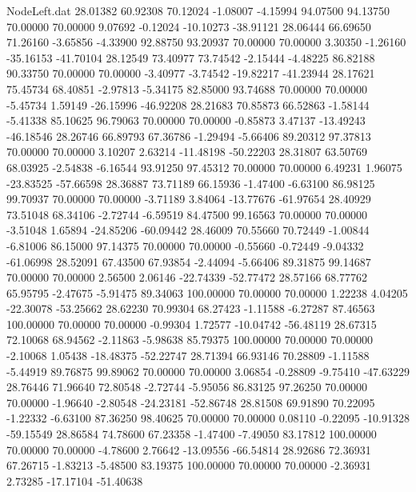 \begin{filecontents}{NodeLeft.dat}
  28.01382   60.92308   70.12024    -1.08007   -4.15994   94.07500   94.13750   70.00000   70.00000    9.07692   -0.12024  -10.10273  -38.91121
  28.06444   66.69650   71.26160    -3.65856   -4.33900   92.88750   93.20937   70.00000   70.00000    3.30350   -1.26160  -35.16153  -41.70104
  28.12549   73.40977   73.74542    -2.15444   -4.48225   86.82188   90.33750   70.00000   70.00000   -3.40977   -3.74542  -19.82217  -41.23944
  28.17621   75.45734   68.40851    -2.97813   -5.34175   82.85000   93.74688   70.00000   70.00000   -5.45734    1.59149  -26.15996  -46.92208
  28.21683   70.85873   66.52863    -1.58144   -5.41338   85.10625   96.79063   70.00000   70.00000   -0.85873    3.47137  -13.49243  -46.18546
  28.26746   66.89793   67.36786    -1.29494   -5.66406   89.20312   97.37813   70.00000   70.00000    3.10207    2.63214  -11.48198  -50.22203
  28.31807   63.50769   68.03925    -2.54838   -6.16544   93.91250   97.45312   70.00000   70.00000    6.49231    1.96075  -23.83525  -57.66598
  28.36887   73.71189   66.15936    -1.47400   -6.63100   86.98125   99.70937   70.00000   70.00000   -3.71189    3.84064  -13.77676  -61.97654
  28.40929   73.51048   68.34106    -2.72744   -6.59519   84.47500   99.16563   70.00000   70.00000   -3.51048    1.65894  -24.85206  -60.09442
  28.46009   70.55660   70.72449    -1.00844   -6.81006   86.15000   97.14375   70.00000   70.00000   -0.55660   -0.72449   -9.04332  -61.06998
  28.52091   67.43500   67.93854    -2.44094   -5.66406   89.31875   99.14687   70.00000   70.00000    2.56500    2.06146  -22.74339  -52.77472
  28.57166   68.77762   65.95795    -2.47675   -5.91475   89.34063  100.00000   70.00000   70.00000    1.22238    4.04205  -22.30078  -53.25662
  28.62230   70.99304   68.27423    -1.11588   -6.27287   87.46563  100.00000   70.00000   70.00000   -0.99304    1.72577  -10.04742  -56.48119
  28.67315   72.10068   68.94562    -2.11863   -5.98638   85.79375  100.00000   70.00000   70.00000   -2.10068    1.05438  -18.48375  -52.22747
  28.71394   66.93146   70.28809    -1.11588   -5.44919   89.76875   99.89062   70.00000   70.00000    3.06854   -0.28809   -9.75410  -47.63229
  28.76446   71.96640   72.80548    -2.72744   -5.95056   86.83125   97.26250   70.00000   70.00000   -1.96640   -2.80548  -24.23181  -52.86748
  28.81508   69.91890   70.22095    -1.22332   -6.63100   87.36250   98.40625   70.00000   70.00000    0.08110   -0.22095  -10.91328  -59.15549
  28.86584   74.78600   67.23358    -1.47400   -7.49050   83.17812  100.00000   70.00000   70.00000   -4.78600    2.76642  -13.09556  -66.54814
  28.92686   72.36931   67.26715    -1.83213   -5.48500   83.19375  100.00000   70.00000   70.00000   -2.36931    2.73285  -17.17104  -51.40638

\end{filecontents}
